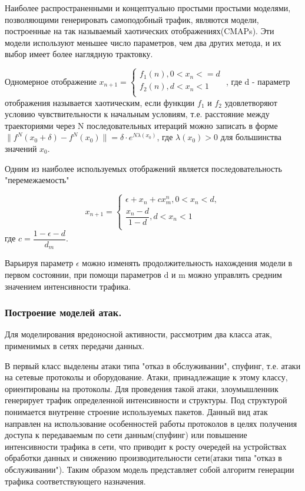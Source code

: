 \documentclass[12pt]{report}
\begin{document}
    Наиболее распространенными и концептуально простыми простыми моделями, позволяющими генерировать самоподобный трафик, являются модели, построенные на так называемый хаотических отображениях(CMAPs). Эти модели используют меньшее число параметров, чем два других метода, и их выбор имеет более наглядную трактовку.

    Одномерное отображение $
        x_{n+1} = \left\{
                    \begin{aligned}
                        f_{1}(n), 0 < x_{n} <= d \\
                        f_{2}(n), d < x_{n} < 1 \\
                    \end{aligned}
                  \right. $
    , где d - параметр отображения называется хаотическим, если функции $f_{1}$ и $f_{2}$ удовлетворяют условию чувствительности к начальным условиям, т.е. расстояние между траекториями через N последовательных итераций можно записать в форме $\|f^{N}(x_{0} + \delta) - f^{N}(x_{0})\| = \delta \cdot e^{N\lambda(x_{0})}$, где $\lambda(x_{0}) > 0$ для большинства значений $x_{0}$.

    Одним из наиболее используемых отображений является последовательность "перемежаемость"

    $$
        x_{n+1} = \left\{
                    \begin{aligned}
                        \epsilon + x_{n} + cx_{m}^{n}, 0 < x_{n} < d, \\
                        \dfrac{x_{n} - d}{1 - d}, d < x_{n} < 1\\
                    \end{aligned}
                  \right.
    $$
    где $c = \dfrac{1 - \epsilon - d}{d_{m}}$.

    Варьируя параметр $\epsilon$ можно изменять продолжительность нахождения модели в первом состоянии, при помощи параметров d и m можно управлять средним значением интенсивности трафика.

    \subsubsection{Построение моделей атак. }

    Для моделирования вредоносной активности, рассмотрим два класса атак, применимых в сетях передачи данных.

    В первый класс выделены атаки типа "отказ в обслуживании", спуфинг, т.е. атаки на сетевые протоколы и оборудование. Атаки, принадлежащие к этому классу, ориентированы на протоколы. Для проведения такой атаки, злоумышленник генерирует трафик определенной интенсивности и структуры. Под структурой понимается внутренне строение используемых пакетов. Данный вид атак направлен на использование особенностей работы протоколов в целях получения доступа к передаваемым по сети данным(спуфинг) или повышение интенсивности трафика в сети, что приводит к росту очередей на устройствах обработки данных и снижению производительности сети(атаки типа "отказ в обслуживании"). Таким образом модель представляет собой алгоритм генерации трафика соответствующего назначения.
\end{document}
